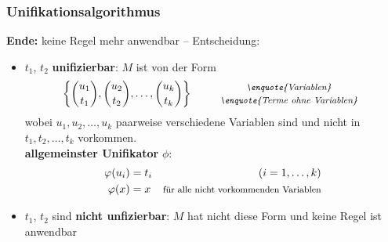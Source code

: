 \documentclass{beamer}
\begin{document}
\begin{frame} \frametitle{Unifikationsalgorithmus}
	\footnotesize
	\textbf{Ende:} keine Regel mehr anwendbar -- Entscheidung:
	\begin{itemize}
		\item $t_1$, $t_2$ \textbf{unifizierbar}: $M$ ist von der Form
		\begin{equation*}
			\menge{\binom{u_1}{t_1}, \binom{u_2}{t_2}, \dots, \binom{u_k}{t_k}} \qquad 
			\begin{array}{c} 
				\footnotesize \text{\textit{\enquote{Variablen}}} \\ 
				\footnotesize \text{\textit{\enquote{Terme ohne Variablen}}}
			\end{array}
		\end{equation*}
		wobei $u_1, u_2, \dots, u_k$ paarweise verschiedene Variablen sind und nicht in $t_1, t_2, \dots, t_k$ vorkommen.  \\
		\textbf{allgemeinster Unifikator} $\phi$: 
		\begin{equation*}
			\begin{aligned}
				\phi(u_i) &= t_i & (i = 1, \dots, k) \\
				\phi(x) &= x     & \footnotesize \text{für alle nicht vorkommenden Variablen}
			\end{aligned}
		\end{equation*}
		\item $t_1$, $t_2$ sind \textbf{nicht unfizierbar}: $M$ hat nicht diese Form und keine Regel ist anwendbar
	\end{itemize}
\end{frame}
\end{document}
